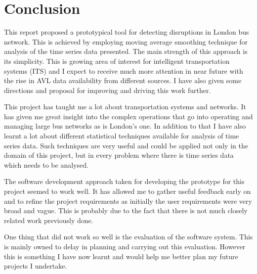 \section{Conclusion}
This report proposed a prototypical tool for detecting disruptions in London bus network. This is achieved by employing moving average smoothing technique for analysis of the time series data presented. The main strength of this approach is its simplicity. This is growing area of interest for intelligent transportation systems (ITS) and I expect to receive much more attention in near future with the rise in AVL data availability from different sources. I have also given some directions and proposal for improving and driving this work further.

This project has taught me a lot about transportation systems and networks. It has given me great insight into the complex operations that go into operating and managing large bus networks as is London's one. In addition to that I have also learnt a lot about different statistical techniques available for analysis of time series data. Such techniques are very useful and could be applied not only in the domain of this project, but in every problem where there is time series data which needs to be analysed. 

The software development approach taken for developing the prototype for this project seemed to work well. It has allowed me to gather useful feedback early on and to refine the project requirements as initially the user requirements were very broad and vague. This is probably due to the fact that there is not much closely related work previously done. 

One thing that did not work so well is the evaluation of the software system. This is mainly owned to delay in planning and carrying out this evaluation. However this is something I have now learnt and would help me better plan my future projects I undertake.


